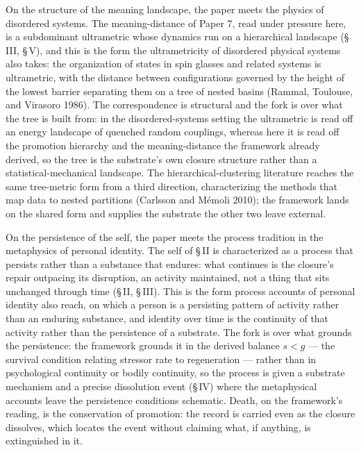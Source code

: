 \documentclass[11pt,oneside]{report}
\theoremstyle{definition}
\theoremstyle{remark}
\begin{document}
On the structure of the meaning landscape, the paper meets the physics of disordered systems. The meaning-distance of Paper 7, read under pressure here, is a subdominant ultrametric whose dynamics run on a hierarchical landscape (\S\,III, \S\,V), and this is the form the ultrametricity of disordered physical systems also takes: the organization of states in spin glasses and related systems is ultrametric, with the distance between configurations governed by the height of the lowest barrier separating them on a tree of nested basins (Rammal, Toulouse, and Virasoro 1986). The correspondence is structural and the fork is over what the tree is built from: in the disordered-systems setting the ultrametric is read off an energy landscape of quenched random couplings, whereas here it is read off the promotion hierarchy and the meaning-distance the framework already derived, so the tree is the substrate's own closure structure rather than a statistical-mechanical landscape. The hierarchical-clustering literature reaches the same tree-metric form from a third direction, characterizing the methods that map data to nested partitions (Carlsson and Mémoli 2010); the framework lands on the shared form and supplies the substrate the other two leave external.

On the persistence of the self, the paper meets the process tradition in the metaphysics of personal identity. The self of \S\,II is characterized as a process that persists rather than a substance that endures: what continues is the closure's repair outpacing its disruption, an activity maintained, not a thing that sits unchanged through time (\S\,II, \S\,III). This is the form process accounts of personal identity also reach, on which a person is a persisting pattern of activity rather than an enduring substance, and identity over time is the continuity of that activity rather than the persistence of a substrate. The fork is over what grounds the persistence: the framework grounds it in the derived balance $s < g$ --- the survival condition relating stressor rate to regeneration --- rather than in psychological continuity or bodily continuity, so the process is given a substrate mechanism and a precise dissolution event (\S\,IV) where the metaphysical accounts leave the persistence conditions schematic. Death, on the framework's reading, is the conservation of promotion: the record is carried even as the closure dissolves, which locates the event without claiming what, if anything, is extinguished in it.
\end{document}
